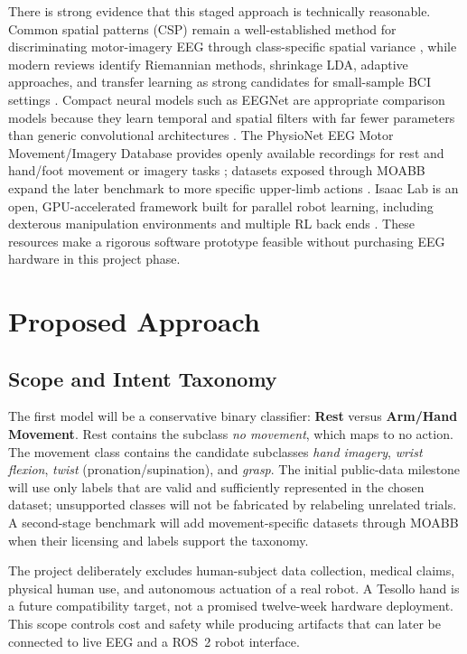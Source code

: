 \documentclass[11pt]{article}
\begin{document}
There is strong evidence that this staged approach is technically reasonable. Common spatial patterns (CSP) remain a well-established method for discriminating motor-imagery EEG through class-specific spatial variance \citep{blankertz2008}, while modern reviews identify Riemannian methods, shrinkage LDA, adaptive approaches, and transfer learning as strong candidates for small-sample BCI settings \citep{lotte2018}. Compact neural models such as EEGNet are appropriate comparison models because they learn temporal and spatial filters with far fewer parameters than generic convolutional architectures \citep{lawhern2018}. The PhysioNet EEG Motor Movement/Imagery Database provides openly available recordings for rest and hand/foot movement or imagery tasks \citep{schalk2009}; datasets exposed through MOABB expand the later benchmark to more specific upper-limb actions \citep{jayaram2018}. Isaac Lab is an open, GPU-accelerated framework built for parallel robot learning, including dexterous manipulation environments and multiple RL back ends \citep{isaaclab}. These resources make a rigorous software prototype feasible without purchasing EEG hardware in this project phase.

\section{Proposed Approach}
\subsection{Scope and Intent Taxonomy}
The first model will be a conservative binary classifier: \textbf{Rest} versus \textbf{Arm/Hand Movement}. Rest contains the subclass \emph{no movement}, which maps to no action. The movement class contains the candidate subclasses \emph{hand imagery}, \emph{wrist flexion}, \emph{twist} (pronation/supination), and \emph{grasp}. The initial public-data milestone will use only labels that are valid and sufficiently represented in the chosen dataset; unsupported classes will not be fabricated by relabeling unrelated trials. A second-stage benchmark will add movement-specific datasets through MOABB when their licensing and labels support the taxonomy.

The project deliberately excludes human-subject data collection, medical claims, physical human use, and autonomous actuation of a real robot. A Tesollo hand is a future compatibility target, not a promised twelve-week hardware deployment. This scope controls cost and safety while producing artifacts that can later be connected to live EEG and a ROS~2 robot interface.
\end{document}
